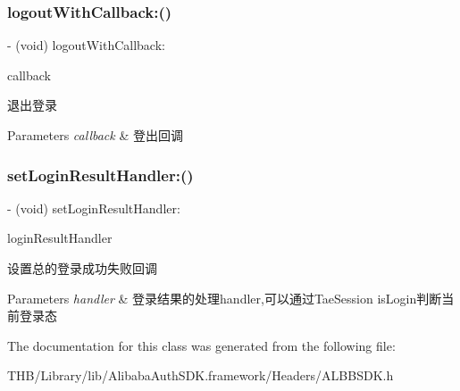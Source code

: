\subsubsection{\texorpdfstring{logout\+With\+Callback\+:()}{logoutWithCallback:()}}
{\footnotesize\ttfamily -\/ (void) logout\+With\+Callback\+: \begin{DoxyParamCaption}\item[{(void($^\wedge$)())}]{callback }\end{DoxyParamCaption}}

退出登录 
\begin{DoxyParams}{Parameters}
{\em callback} & 登出回调 \\
\hline
\end{DoxyParams}
\mbox{\label{interface_a_l_b_b_s_d_k_aa834b88348aed1ba4dfcbf3d40008a16}} 
\subsubsection{\texorpdfstring{set\+Login\+Result\+Handler\+:()}{setLoginResultHandler:()}}
{\footnotesize\ttfamily -\/ (void) set\+Login\+Result\+Handler\+: \begin{DoxyParamCaption}\item[{(void($^\wedge$)(\mbox{\hyperlink{interface_a_l_b_b_session}{A\+L\+B\+B\+Session}} $\ast$session))}]{login\+Result\+Handler }\end{DoxyParamCaption}}

设置总的登录成功失败回调 
\begin{DoxyParams}{Parameters}
{\em handler} & 登录结果的处理handler,可以通过\+Tae\+Session is\+Login判断当前登录态 \\
\hline
\end{DoxyParams}


The documentation for this class was generated from the following file\+:\begin{DoxyCompactItemize}
\item 
T\+H\+B/\+Library/lib/\+Alibaba\+Auth\+S\+D\+K.\+framework/\+Headers/A\+L\+B\+B\+S\+D\+K.\+h\end{DoxyCompactItemize}
